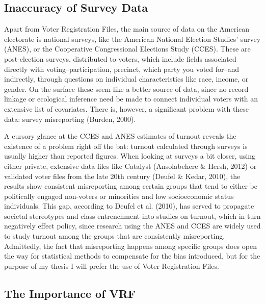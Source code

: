 \documentclass[12pt,twoside]{reedthesis}
\begin{document}
  \subsection{Inaccuracy of Survey Data}\label{inaccuracy-of-survey-data}
  
  Apart from Voter Registration Files, the main source of data on the
  American electorate is national surveys, like the American National
  Election Studies' survey (ANES), or the Cooperative Congressional
  Elections Study (CCES). These are post-election surveys, distributed to
  voters, which include fields associated directly with
  voting--participation, precinct, which party you voted for--and
  indirectly, through questions on individual characteristics like race,
  income, or gender. On the surface these seem like a better source of
  data, since no record linkage or ecological inference need be made to
  connect individual voters with an extensive list of covariates. There
  is, however, a significant problem with these data: survey misreporting
  (Burden, 2000).
  
  A cursory glance at the CCES and ANES estimates of turnout reveals the
  existence of a problem right off the bat: turnout calculated through
  surveys is usually higher than reported figures. When looking at surveys
  a bit closer, using either private, extensive data files like Catalyst
  (Ansolabehere \& Hersh, 2012) or validated voter files from the late
  20th century (Deufel \& Kedar, 2010), the results show consistent
  misreporting among certain groups that tend to either be politically
  engaged non-voters or minorities and low socioeconomic status
  individuals. This gap, according to Deufel et al. (2010), has served to
  propagate societal stereotypes and class entrenchment into studies on
  turnout, which in turn negatively effect policy, since research using
  the ANES and CCES are widely used to study turnout among the groups that
  are consistently misreporting. Admittedly, the fact that misreporting
  happens among specific groups does open the way for statistical methods
  to compensate for the bias introduced, but for the purpose of my thesis
  I will prefer the use of Voter Registration Files.
  
  \subsection{The Importance of VRF}\label{the-importance-of-vrf}
  
\end{document}
